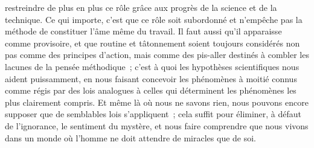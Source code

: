 \documentclass[french,twoside]{book} %
\begin{document}
restreindre de plus en plus ce rôle grâce aux progrès de la science et de la technique. Ce qui importe, c'est que ce rôle soit subordonné et n'empêche pas la méthode de constituer l'âme même du travail. Il faut aussi qu'il apparaisse comme provisoire, et que routine et tâtonnement soient toujours considérés non pas comme des principes d'action, mais comme des pis-aller destinés à combler les lacunes de la pensée méthodique ; c'est à quoi les hypothèses scientifiques nous aident puissamment, en nous faisant concevoir les phénomènes à moitié connus comme régis par des lois analogues à celles qui déterminent les phénomènes les plus clairement compris. Et même là où nous ne savons rien, nous pouvons encore supposer que de semblables lois s'appliquent ; cela suffit pour éliminer, à défaut de l'ignorance, le sentiment du mystère, et nous faire comprendre que nous vivons dans un monde où l'homme ne doit attendre de miracles que de soi.\par
\end{document}
